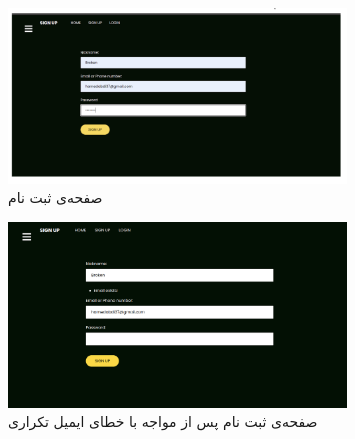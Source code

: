 \begin{figure}[H]
    \centering
        \includegraphics[width = 0.8\textwidth]{files/ui/signup.png}
        \caption{صفحه‌ی ثبت نام}
\end{figure} 
\begin{figure}[H]
    \centering
        \includegraphics[width = 0.8\textwidth]{files/ui/sameemail.png}
        \caption{صفحه‌ی ثبت نام پس از مواجه با خطای ایمیل تکراری }
\end{figure} 

